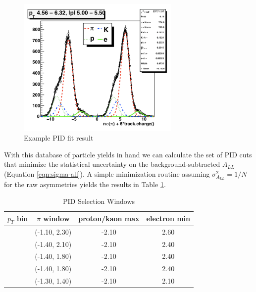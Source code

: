 \begin{figure}
  \begin{center}
    \includegraphics[width=0.7\textwidth]{figures/typical-nsigmapi}    
  \end{center}
  \caption{Example PID fit result}
  \label{fig:typical-nsigmapi}
\end{figure}

With this database of particle yields in hand we can calculate the set of PID cuts that minimize the statistical uncertainty on the background-subtracted $A_{LL}$ (Equation \ref{eqn:sigma-all}).  A simple minimization routine assuming $\sigma_{A_{LL}}^{2} = 1/N$ for the raw asymmetries yields the results in Table \ref{tbl:pid-selection-windows}.

\begin{table}
    \begin{center}
        \begin{tabular}{c|ccc}
        \hline
        $p_{T}$ bin & $\pi$ window & proton/kaon max & electron min\\
        \hline
        \hline
        [2.00 - 3.18] & (-1.10, 2.30) & -2.10 & 2.60\\
        \hline
        [3.18 - 4.56] & (-1.40, 2.10) & -2.10 & 2.40\\
        \hline
        [4.56 - 6.32] & (-1.40, 1.80) & -2.10 & 2.40\\
        \hline
        [6.32 - 8.80] & (-1.40, 1.80) & -2.10 & 2.40\\
        \hline
        [8.80 - 12.84] & (-1.30, 1.40) & -2.10 & 2.10\\
    \hline
    \end{tabular}
    \end{center}
    \caption{PID Selection Windows}
    \label{tbl:pid-selection-windows}
\end{table}
